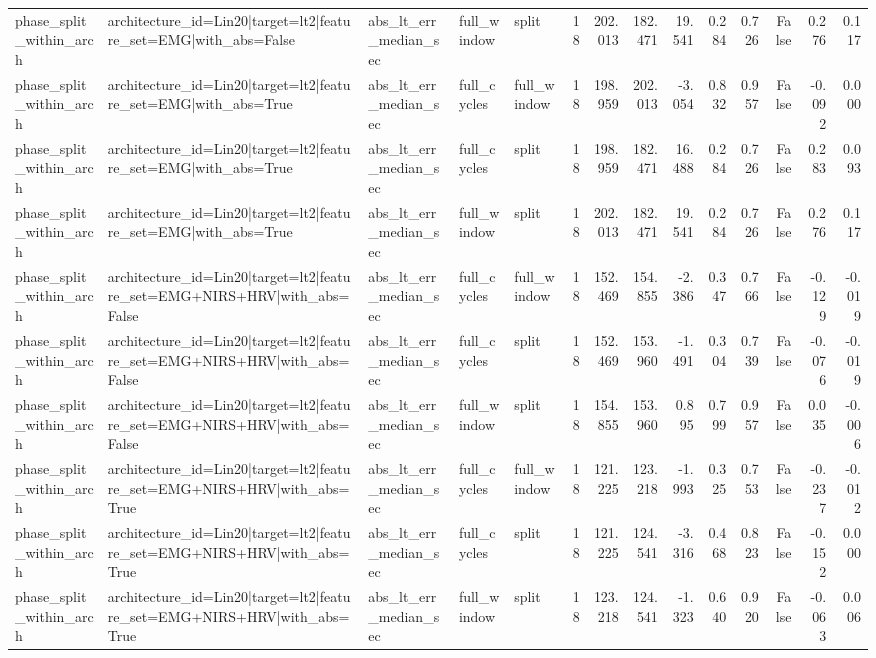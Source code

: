\begin{table}
\begin{tabular}{lllllrrrrrrrrr}
phase_split_within_arch & architecture_id=Lin20|target=lt2|feature_set=EMG|with_abs=False & abs_lt_err_median_sec & full_window & split & 18 & 202.013 & 182.471 & 19.541 & 0.284 & 0.726 & False & 0.276 & 0.117 \\
phase_split_within_arch & architecture_id=Lin20|target=lt2|feature_set=EMG|with_abs=True & abs_lt_err_median_sec & full_cycles & full_window & 18 & 198.959 & 202.013 & -3.054 & 0.832 & 0.957 & False & -0.092 & 0.000 \\
phase_split_within_arch & architecture_id=Lin20|target=lt2|feature_set=EMG|with_abs=True & abs_lt_err_median_sec & full_cycles & split & 18 & 198.959 & 182.471 & 16.488 & 0.284 & 0.726 & False & 0.283 & 0.093 \\
phase_split_within_arch & architecture_id=Lin20|target=lt2|feature_set=EMG|with_abs=True & abs_lt_err_median_sec & full_window & split & 18 & 202.013 & 182.471 & 19.541 & 0.284 & 0.726 & False & 0.276 & 0.117 \\
phase_split_within_arch & architecture_id=Lin20|target=lt2|feature_set=EMG+NIRS+HRV|with_abs=False & abs_lt_err_median_sec & full_cycles & full_window & 18 & 152.469 & 154.855 & -2.386 & 0.347 & 0.766 & False & -0.129 & -0.019 \\
phase_split_within_arch & architecture_id=Lin20|target=lt2|feature_set=EMG+NIRS+HRV|with_abs=False & abs_lt_err_median_sec & full_cycles & split & 18 & 152.469 & 153.960 & -1.491 & 0.304 & 0.739 & False & -0.076 & -0.019 \\
phase_split_within_arch & architecture_id=Lin20|target=lt2|feature_set=EMG+NIRS+HRV|with_abs=False & abs_lt_err_median_sec & full_window & split & 18 & 154.855 & 153.960 & 0.895 & 0.799 & 0.957 & False & 0.035 & -0.006 \\
phase_split_within_arch & architecture_id=Lin20|target=lt2|feature_set=EMG+NIRS+HRV|with_abs=True & abs_lt_err_median_sec & full_cycles & full_window & 18 & 121.225 & 123.218 & -1.993 & 0.325 & 0.753 & False & -0.237 & -0.012 \\
phase_split_within_arch & architecture_id=Lin20|target=lt2|feature_set=EMG+NIRS+HRV|with_abs=True & abs_lt_err_median_sec & full_cycles & split & 18 & 121.225 & 124.541 & -3.316 & 0.468 & 0.823 & False & -0.152 & 0.000 \\
phase_split_within_arch & architecture_id=Lin20|target=lt2|feature_set=EMG+NIRS+HRV|with_abs=True & abs_lt_err_median_sec & full_window & split & 18 & 123.218 & 124.541 & -1.323 & 0.640 & 0.920 & False & -0.063 & 0.006 \\

\end{tabular}
\end{table}
